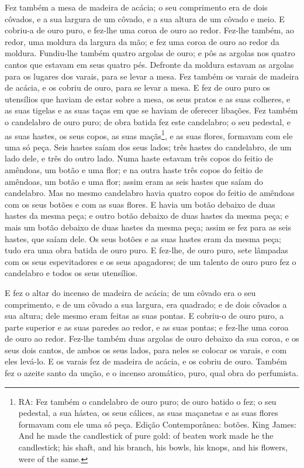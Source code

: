 Fez também a mesa de madeira de acácia; o seu comprimento era de
dois côvados, e a sua largura de um côvado, e a sua altura de um
côvado e meio. E cobriu-a de ouro puro, e fez-lhe uma coroa
de ouro ao redor. Fez-lhe também, ao redor, uma moldura da
largura da mão; e fez uma coroa de ouro ao redor da moldura.
Fundiu-lhe também quatro argolas de ouro; e pôs as argolas
nos quatro cantos que estavam em seus quatro pés. Defronte da
moldura estavam as argolas para os lugares dos varais, para se levar
a mesa. Fez também os varais de madeira de acácia, e os
cobriu de ouro, para se levar a mesa. E fez de ouro puro os
utensílios que haviam de estar sobre a mesa, os seus pratos e as
suas colheres, e as suas tigelas e as suas taças em que se haviam de
oferecer libações. Fez também o candelabro de ouro puro; de
obra batida fez este candelabro; o seu pedestal, e as suas hastes,
os seus copos, as suas maçãs\footnote{RA: Fez também o candelabro de
ouro puro; de ouro batido o fez; o seu pedestal, a sua hástea, os
seus cálices, as suas maçanetas e as suas flores formavam com ele
uma só peça. Edição Contemporânea: botões. King James: And he made
the candlestick of pure gold: of beaten work made he the
candlestick; his shaft, and his branch, his bowls, his knops, and
his flowers, were of the same.}, e as suas flores, formavam com ele
uma só peça. Seis hastes saíam dos seus lados; três hastes do
candelabro, de um lado dele, e três do outro lado. Numa haste
estavam três copos do feitio de amêndoas, um botão e uma flor; e na
outra haste três copos do feitio de amêndoas, um botão e uma flor;
assim eram as seis hastes que saíam do candelabro. Mas no
mesmo candelabro havia quatro copos do feitio de amêndoas com os
seus botões e com as suas flores. E havia um botão debaixo de
duas hastes da mesma peça; e outro botão debaixo de duas hastes da
mesma peça; e mais um botão debaixo de duas hastes da mesma peça;
assim se fez para as seis hastes, que saíam dele. Os seus
botões e as suas hastes eram da mesma peça; tudo era uma obra batida
de ouro puro. E fez-lhe, de ouro puro, sete lâmpadas com os
seus espevitadores e os seus apagadores; de um talento de
ouro puro fez o candelabro e todos os seus utensílios.

E fez o altar do incenso de madeira de acácia; de um côvado era o
seu comprimento, e de um côvado a sua largura, era quadrado; e de
dois côvados a sua altura; dele mesmo eram feitas as suas pontas.
E cobriu-o de ouro puro, a parte superior e as suas paredes
ao redor, e as suas pontas; e fez-lhe uma coroa de ouro ao redor.
Fez-lhe também duas argolas de ouro debaixo da sua coroa, e
os seus dois cantos, de ambos os seus lados, para neles se colocar
os varais, e com eles levá-lo. E os varais fez de madeira de
acácia, e os cobriu de ouro. Também fez o azeite santo da
unção, e o incenso aromático, puro, qual obra do perfumista.

